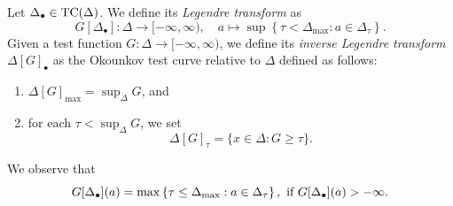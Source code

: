 \begin{definition}\label{def:LegOkoun}
    Let $\Delta_{\bullet}\in \mathrm{TC}(\Delta)$. We define its \emph{Legendre transform} as
    \[
	   G[\Delta_{\bullet}] \colon \Delta\rightarrow [-\infty,\infty),\quad a\mapsto \sup\left\{\tau<\Delta_{\max}:a\in \Delta_{\tau}\right\}.
	\]
     Given a test function $G\colon \Delta\rightarrow [-\infty,\infty)$, we define its \emph{inverse Legendre transform} $\Delta[G]_{\bullet}$ as the Okounkov test curve relative to $\Delta$ defined as follows:
     \begin{enumerate}
         \item\label{itm:def:LegOkoun:1} $\Delta[G]_{\max}=\sup_{\Delta} G$, and
         \item\label{itm:def:LegOkoun:2} for each $\tau<\sup_{\Delta} G$, we set
         \[
         \Delta[G]_{\tau}=\{x\in \Delta:G\geq \tau\}.
         \]
     \end{enumerate}
\end{definition}
We observe that
\begin{equation}\label{eq:GDeltamax}
    G[\Delta_{\bullet}](a)=\max\left\{\tau\leq \Delta_{\max}: a\in \Delta_{\tau}\right\},\textup{ if } G[\Delta_{\bullet}](a)>-\infty.
\end{equation}

